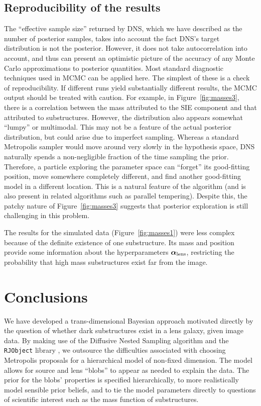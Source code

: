 \documentclass[useAMS,usenatbib]{mn2e}
\begin{document}
\subsection{Reproducibility of the results}\label{sec:convergence}
The ``effective sample size'' returned by DNS, which we have described as the
number of posterior samples, takes into account the fact DNS's target
distribution is not the posterior. However, it does not take autocorrelation
into account, and thus can present an optimistic picture of the accuracy of
any Monte Carlo approximations to posterior quantities. Most standard diagnostic
techniques used in MCMC can be applied here. The simplest of these is a
check of reproducibility. If different runs yield substantially different
results, the MCMC output should be treated with caution. For example, in
Figure~\ref{fig:masses3}, there is a correlation between the mass attributed
to the SIE component and that attributed to substructures. However, the
distribution also appears somewhat ``lumpy'' or multimodal. This may
not be a feature of the actual posterior distribution, but could arise due to
imperfect sampling. Whereas a standard Metropolis sampler would move around
very slowly in the hypothesis space, DNS naturally spends a non-negligible fraction
of the time sampling the prior. Therefore, a particle exploring the parameter
space can ``forget'' its good-fitting position, move somewhere completely
different, and find another good-fitting model in a different location. This
is a natural feature of the algorithm (and is also present in related
algorithms such as parallel tempering). Despite this, the patchy
nature of Figure~\ref{fig:masses3} suggests that posterior exploration is
still challenging in this problem.

The results for the simulated data (Figure~\ref{fig:masses1})
were less complex because of the definite existence of one substructure.
Its mass and position provide some information about the hyperparameters
$\boldsymbol{\alpha}_{\rm lens}$, restricting the probability that
high mass substructures exist far from the image.

\section{Conclusions}
We have developed a trans-dimensional Bayesian approach motivated directly by
the question of whether dark substructures exist in a lens galaxy, given image
data. By making use of the Diffusive Nested Sampling algorithm \citep{dnest}
and the {\tt RJObject} library \citep{rjobject}, we outsource the difficulties
associated with choosing Metropolis proposals for a hierarchical model of
non-fixed dimension. The model allows for source and lens ``blobs'' to appear
as needed to explain the data. The prior for the blobs' properties is
specified hierarchically, to more realistically model sensible prior beliefs,
and to tie the model parameters directly to questions of scientific interest
such as the mass function of substructures.
\end{document}
